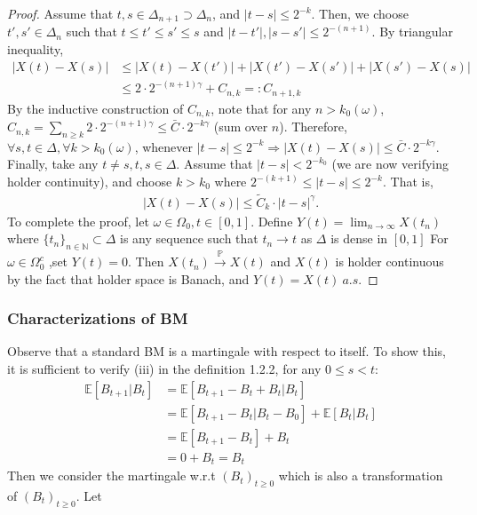 \documentclass[11pt,english]{smfart}
\newcommand{\mb}{\mathbb}
\begin{document}
\begin{proof}
    Assume that $t,s \in \Delta_{n+1} \supset \Delta_n $, and $|t-s| \leq 2^{-k}$. Then, we choose $t',s' \in \Delta_n$ such that $t\leq t' \leq s' \leq s$ and $|t-t'|, |s-s'| \leq 2^{-(n+1)}$. By triangular inequality, \begin{align*}
        |X(t) - X(s)| &\leq |X(t) - X(t') | + |X(t') - X(s')| + |X(s') - X(s)| \\
        &\leq 2\cdot 2^{-(n+1)\gamma} + C_{n,k} =: C_{n+1,k}
    \end{align*}
    By the inductive construction of $C_{n,k}$, note that for any $n > k_0(\omega)$, $C_{n,k} = \sum_{n\geq k} 2\cdot 2^{-(n+1)\gamma} \leq \bar{C} \cdot 2^{-k\gamma}$ (sum over $n$). Therefore, $\forall s,t \in \Delta, \forall k > k_0(\omega)$, whenever $|t-s| \leq 2^{-k} \Rightarrow |X(t) - X(s)| \leq \bar{C} \cdot 2^{-k\gamma}$. Finally, take any $t\neq s, t,s\in \Delta$. Assume that $|t-s| < 2^{-k_0}$ (we are now verifying holder continuity), and choose $k > k_0$ where $2^{-(k+1)} \leq |t-s| \leq 2^{-k}$. That is, \begin{align*}
        |X(t) -X(s)| \leq \tilde{C}_k \cdot |t-s|^\gamma.
    \end{align*}
    To complete the proof, let $\omega \in \Omega_0, t\in [0,1]$. Define $Y(t) = \lim_{n\rightarrow \infty} X(t_n)$ where $\{t_n\}_{n\in \mb{N}} \subset \Delta$ is any sequence such that $t_n \rightarrow t $ as $\Delta$ is dense in $[0,1]$  For $\omega \in \Omega_0^c$ ,set $Y(t) = 0$. Then $X(t_n) \xrightarrow{\mb{P}} X(t)$  and $X(t)$ is holder continuous by the fact that holder space is Banach, and $Y(t) = X(t)\  a.s.$
\end{proof}

\subsubsection{Characterizations of BM}

Observe that a standard BM is a martingale with respect to itself. To show this, it is sufficient to verify (iii) in the definition 1.2.2, for any $ 0 \le s <t$:
\begin{align*}
    \mb{E}[B_{t+1}|B_t] &= \mb{E}[B_{t+1}-B_t +B_t | B_t] \\
    & = \mb{E}[B_{t+1}-B_t|B_t-B_0] + \mb{E}[B_t|B_t]\\
    & = \mb{E}[B_{t+1}-B_t] + B_t \\
    & = 0 + B_t = B_t
\end{align*}
Then we consider the martingale w.r.t $(B_t)_{t\ge 0}$ which is also a transformation of $(B_t)_{t\ge 0}$. Let
\end{document}
